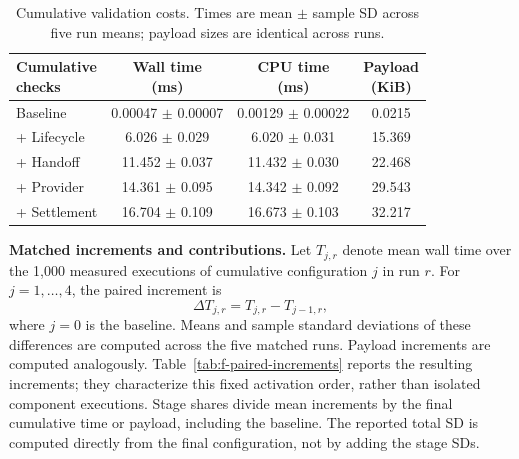 \begin{table}[!t]
\centering
\caption{Cumulative validation costs. Times are mean $\pm$ sample SD
across five run means; payload sizes are identical across runs.}
\label{tab:f-cumulative-cost}
\footnotesize
\renewcommand{\arraystretch}{1.08}
\setlength{\tabcolsep}{3pt}
\begin{tabular*}{\columnwidth}{@{\hspace{3pt}}l@{\extracolsep{\fill}}ccc@{\hspace{3pt}}}
\toprule
\shortstack{\textbf{Cumulative}\\\textbf{checks}}
& \shortstack{\textbf{Wall time}\\\textbf{(ms)}}
& \shortstack{\textbf{CPU time}\\\textbf{(ms)}}
& \shortstack{\textbf{Payload}\\\textbf{(KiB)}} \\
\midrule
Baseline & 0.00047 $\pm$ 0.00007 & 0.00129 $\pm$ 0.00022 & 0.0215 \\
+ Lifecycle & 6.026 $\pm$ 0.029 & 6.020 $\pm$ 0.031 & 15.369 \\
+ Handoff & 11.452 $\pm$ 0.037 & 11.432 $\pm$ 0.030 & 22.468 \\
+ Provider & 14.361 $\pm$ 0.095 & 14.342 $\pm$ 0.092 & 29.543 \\
+ Settlement & 16.704 $\pm$ 0.109 & 16.673 $\pm$ 0.103 & 32.217 \\
\bottomrule
\end{tabular*}
\end{table}

\noindent\textbf{Matched increments and contributions.}
Let $T_{j,r}$ denote mean wall time over the 1,000 measured executions
of cumulative configuration $j$ in run $r$.
For $j=1,\ldots,4$, the paired increment is
\[
 \Delta T_{j,r}=T_{j,r}-T_{j-1,r},
\]
where $j=0$ is the baseline.
Means and sample standard deviations of these differences are computed
across the five matched runs.
Payload increments are computed analogously.
Table~\ref{tab:f-paired-increments} reports the resulting increments;
they characterize this fixed activation order, rather than isolated
component executions.
Stage shares divide mean increments by the final cumulative time or
payload, including the baseline.
The reported total SD is computed directly from the final configuration,
not by adding the stage SDs.

